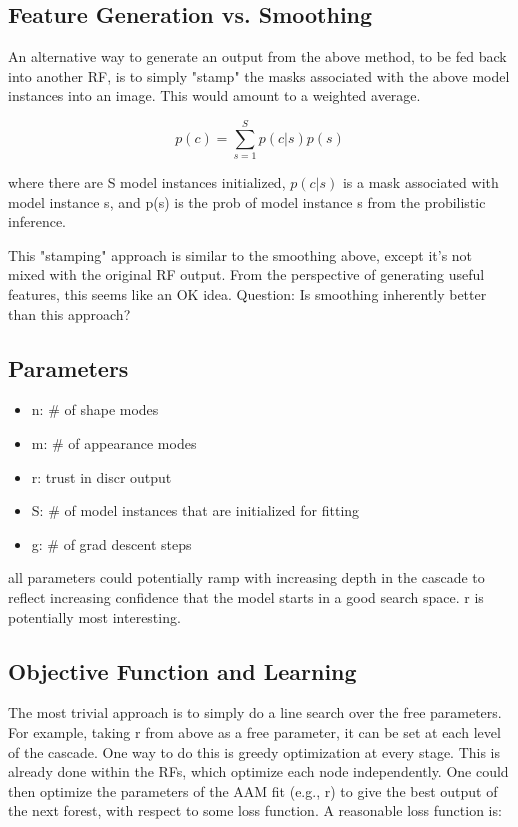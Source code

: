 \documentclass[10pt,twocolumn,letterpaper]{article}
\begin{document}
\subsection{Feature Generation vs. Smoothing}

An alternative way to generate an output from the above method, to be fed back into another RF, is to simply "stamp" the masks associated with the above model instances into an image.  This would amount to a weighted average.

\[ p(c) = \sum_{s=1}^S p(c|s)p(s) \]

where there are S model instances initialized, $p(c|s)$ is a mask associated with model instance s, and p(s) is the prob of model instance s from the probilistic inference.

This "stamping" approach is similar to the smoothing above, except it's not mixed with the original RF output.  From the perspective of generating useful features, this seems like an OK idea.  Question: Is smoothing inherently better than this approach?

\subsection{Parameters}

\begin{itemize}
\item n: \# of shape modes
\item m: \# of appearance modes
\item r: trust in discr output
\item S: \# of model instances that are initialized for fitting
\item g: \# of grad descent steps
\end{itemize}

all parameters could potentially ramp with increasing depth in the cascade to reflect increasing confidence that the model starts in a good search space.  r is potentially most interesting.

\subsection{Objective Function and Learning}

The most trivial approach is to simply do a line search over the free parameters. For example, taking r from above as a free parameter, it can be set at each level of the cascade. One way to do this is greedy optimization at every stage.  This is already done within the RFs, which optimize each node independently.  One could then optimize the parameters of the AAM fit (e.g., r) to give the best output of the next forest, with respect to some loss function.  A reasonable loss function is:
\end{document}
